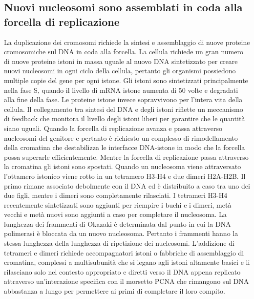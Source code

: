 \subsection{Nuovi nucleosomi sono assemblati in coda alla forcella di replicazione}
La duplicazione dei cromosomi richiede la sintesi e assemblaggio di nuove proteine cromosomiche sul DNA in coda alla forcella. La cellula richiede un gran numero di nuove proteine 
istoni in massa uguale al nuovo DNA sintetizzato per creare nuovi nucleosomi in ogni ciclo della cellula, pertanto gli organismi possiedono multiple copie del gene per ogni istone. Gli
istoni sono sintetizzati principalmente nella fase S, quando il livello di mRNA istone aumenta di $50$ volte e degradati alla fine della fase. Le proteine istone invece sopravvivono per
l'intera vita della cellula. Il collegamento tra sintesi del DNA e degli istoni riflette un meccanismo di feedback che monitora il livello degli istoni liberi per garantire che le 
quantit\`a siano uguali. Quando la forcella di replicazione avanza e passa attraverso nucleosomi del genitore e pertanto \`e richiesto un complesso di rimodellamento della cromatina
che destabilizza le interfacce DNA-istone in modo che la forcella possa superarle efficientemente. Mentre la forcella di replicazione passa attraverso la cromatina gli istoni sono
spostati. Quando un nucleosoma viene attraversato l'ottamero istonico viene rotto in un tetramero H3-H4 e due dimeri H2A-H2B. Il primo rimane associato debolmente con il DNA ed \`e
distribuito a caso tra uno dei due figli, mentre i dimeri sono completamente rilasciati. I tetrameri H3-H4 recentemente sintetizzati sono aggiunti per riempire i buchi e i dimeri, met\`a
vecchi e met\`a nuovi sono aggiunti a caso per completare il nucleosoma. La lunghezza dei frammenti di Okazaki \`e determinata dal punto in cui la DNA polimerasi \`e bloccata da un 
nuovo nucleosoma. Pertanto i frammenti hanno la stessa lunghezza della lunghezza di ripetizione dei nucleosomi. L'addizione di tetrameri e dimeri richiede accompagnatori istoni o 
fabbriche di assemblaggio di cromatina, complessi a multisubunit\`a che si legano agli istoni altamente basici e li rilasciano solo nel contesto appropriato e diretti verso il DNA 
appena replicato attraverso un'interazione specifica con il morsetto PCNA che rimangono sul DNA abbastanza a lungo per permettere ai primi di completare il loro compito.

